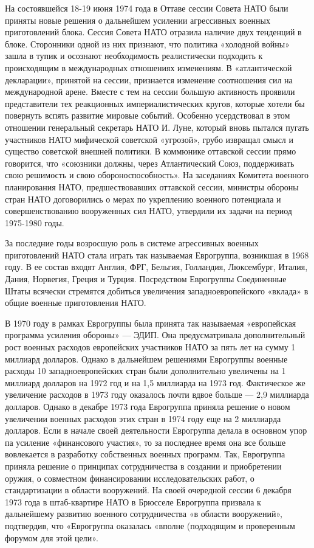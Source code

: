 \documentclass[12pt, a4paper, openany]{book}
\begin{document}
	На состоявшейся 18-19 июня 1974 года в Оттаве сессии Совета НАТО были приняты новые решения о дальнейшем усилении агрессивных военных приготовлений блока. Сессия Совета НАТО отразила наличие двух тенденций в блоке. Сторонники одной из них признают, что политика «холодной войны» зашла в тупик и осознают необходимость реалистически подходить к происходящим в международных отношениях изменениям. В «атлантической декларации», принятой на сессии, признается изменение соотношения сил на международной арене. Вместе с тем на сессии большую активность проявили представители тех реакционных империалистических кругов, которые хотели бы повернуть вспять развитие мировые событий. Особенно усердствовал в этом отношении генеральный секретарь НАТО И. Луне, который вновь пытался пугать участников НАТО мифической советской «угрозой», грубо извращал смысл и существо советской внешней политики. В коммюнике оттавской сессии прямо говорится, что «союзники должны, через Атлантический Союз, поддерживать свою решимость и свою обороноспособность». На заседаниях Комитета военного планирования НАТО, предшествовавших оттавской сессии, министры обороны стран НАТО договорились о мерах по укреплению военного потенциала и совершенствованию вооруженных сил НАТО, утвердили их задачи на период 1975-1980 годы.
	
	За последние годы возросшую роль в системе агрессивных военных приготовлений НАТО стала играть так называемая Еврогруппа, возникшая в 1968 году. В ее состав входят Англия, ФРГ, Бельгия, Голландия, Люксембург, Италия, Дания, Норвегия, Греция и Турция. Посредством Еврогруппы Соединенные Штаты всячески стремятся добиться увеличения западноевропейского «вклада» в общие военные приготовления НАТО.
	
	В 1970 году в рамках Еврогруппы была принята так называемая «европейская программа усиления обороны» — ЭДИП. Она предусматривала дополнительный рост военных расходов европейских участников НАТО за пять лет на сумму 1 миллиард долларов. Однако в дальнейшем решениями Еврогруппы военные расходы 10 западноевропейских стран были дополнительно увеличены на 1 миллиард долларов на 1972 год и на 1,5 миллиарда на 1973 год. Фактическое же увеличение расходов в 1973 году оказалось почти вдвое больше — 2,9 миллиарда долларов. Однако в декабре 1973 года Еврогруппа приняла решение о новом увеличении военных расходов этих стран в 1974 году еще на 2 миллиарда долларов. Если в начале своей деятельности Еврогруппа делала в основном упор па усиление «финансового участия», то за последнее время она все больше вовлекается в разработку собственных военных программ. Так, Еврогруппа приняла решение о принципах сотрудничества в создании и приобретении оружия, о совместном финансировании исследовательских работ, о стандартизации в области вооружений. На своей очередной сессии 6 декабря 1973 года в штаб-квартире НАТО в Брюсселе Еврогруппа призвала к дальнейшему развитию военного сотрудничества «в области вооружений», подтвердив, что «Еврогруппа оказалась «вполне (подходящим и проверенным форумом для этой цели».
	
\end{document}
